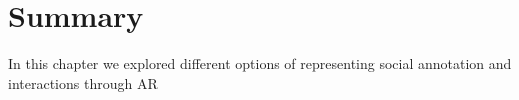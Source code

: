 \section{Summary}

In this chapter we explored different options of representing social annotation and interactions through AR

